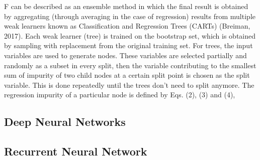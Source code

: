 F can be described as an ensemble method in which the final result is obtained by aggregating (through averaging in the case of regression) results from multiple weak learners known as Classification and Regression Trees (CARTs) (Breiman, 2017). Each weak learner (tree) is trained on the bootstrap set, which is obtained by sampling with replacement from the original training set. For trees, the input variables are used to generate nodes. These variables are selected partially and randomly as a subset in every split, then the variable contributing to the smallest sum of impurity of two child nodes at a certain split point is chosen as the split variable. This is done repeatedly until the trees don't need to split anymore. The regression impurity of a particular node is defined by Eqs. (2), (3) and (4), \citep{wangMachineLearningFramework2021}

\subsection{Deep Neural Networks}

\subsection{Recurrent Neural Network}


